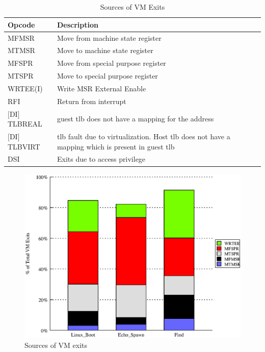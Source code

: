 \documentclass[10pt,twocolumn]{article}
\begin{document}
\begin{table}[!b]
\centering
\caption{Sources of VM Exits}
     \begin{tabular}{|l | p{5cm} |} \hline
       Opcode \verb, , & Description \\ \hline
       MFMSR & Move from machine state register \\ \hline
       MTMSR & Move to machine state register \\\hline
	   MFSPR & Move from special purpose register \\\hline
	   MTSPR & Move to special purpose register \\\hline
	   WRTEE(I) & Write MSR External Enable  \\\hline
	   RFI & Return from interrupt \\\hline
	   $[$DI$]$TLBREAL & guest tlb does not have a mapping for the address\\\hline
	   $[$DI$]$TLBVIRT & tlb fault due to virtualization. Host tlb does not have a mapping which is present in guest tlb \\    \hline
   	   DSI & Exits due to access privilege \\\hline

     \end{tabular}
\label{tab:priv_opcodes}
\end{table}

\begin{figure}[!htb]
\centering

\includegraphics[scale=0.5]{exit_count.eps}
\caption{Sources of VM exits}
\label{fig:opcode_time_fraction}
\end{figure}
\end{document}
